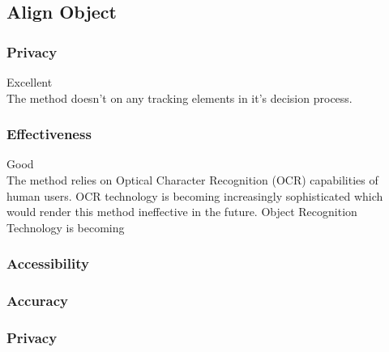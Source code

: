 \subsection{Align Object}
\subsubsection{Privacy}
Excellent\\
The method doesn't on any tracking elements in it's decision process.

\subsubsection{Effectiveness}
Good\\
The method relies on Optical Character Recognition (OCR) capabilities of human
users. OCR technology is becoming increasingly sophisticated which would render
this method ineffective in the future.
Object  Recognition Technology is becoming
\subsubsection{Accessibility}
\subsubsection{Accuracy}
\subsubsection{Privacy}
